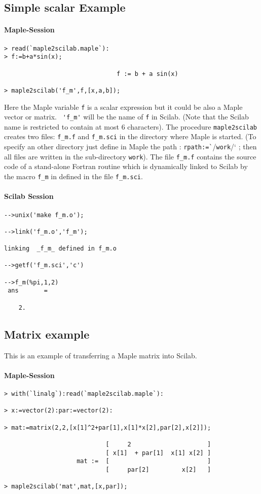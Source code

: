 \subsection{Simple scalar Example}
\paragraph{Maple-Session}
\begin{verbatim}
> read(`maple2scilab.maple`):
> f:=b+a*sin(x);

                               f := b + a sin(x)

> maple2scilab('f_m',f,[x,a,b]);
\end{verbatim}
Here the Maple variable \verb!f! is a scalar expression but it could be also
a Maple vector or matrix.
\verb/ 'f_m'/ will be the name of \verb!f! in Scilab. 
(Note that the Scilab name is restricted to contain at most 6 characters).
The procedure \verb/maple2scilab/ creates two files: \verb/f_m.f/ 
and  \verb/f_m.sci/ in the directory where Maple is started.
(To specify an other directory just define in Maple the path : 
\verb/rpath:=`//\verb/work//` ; then all files are written in 
the sub-directory \verb/work/).
The file \verb!f_m.f! contains the source code of a stand-alone Fortran
routine which is dynamically linked to Scilab by the macro \verb!f_m! in
defined in the file \verb!f_m.sci!.

\paragraph{Scilab Session}
\begin{verbatim}
-->unix('make f_m.o');
 
-->link('f_m.o','f_m');

linking  _f_m_ defined in f_m.o  
 
-->getf('f_m.sci','c')
 
-->f_m(%pi,1,2)
 ans       =
 
    2.  
\end{verbatim}

\subsection{Matrix example}
This is an example of transferring a Maple matrix into Scilab.
\paragraph{Maple-Session}
\begin{verbatim}
> with(`linalg`):read(`maple2scilab.maple`):

> x:=vector(2):par:=vector(2):

> mat:=matrix(2,2,[x[1]^2+par[1],x[1]*x[2],par[2],x[2]]);

                            [     2                     ]
                            [ x[1]  + par[1]  x[1] x[2] ]
                    mat :=  [                           ]
                            [     par[2]         x[2]   ]

> maple2scilab('mat',mat,[x,par]);

\end{verbatim}

